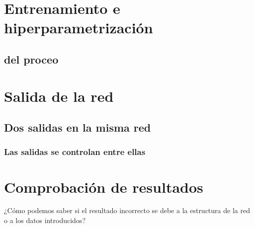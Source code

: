
\section{Entrenamiento e hiperparametrización}

\subsection{ del proceo}

\subsection{}

\subsection{}

\subsection{}


\section{Salida de la red}

\subsection{Dos salidas en la misma red}

\subsubsection{Las salidas se controlan entre ellas}


\section{Comprobación de resultados}

¿Cómo podemos saber si el resultado incorrecto se debe a la estructura de la red o a los datos introducidos?


